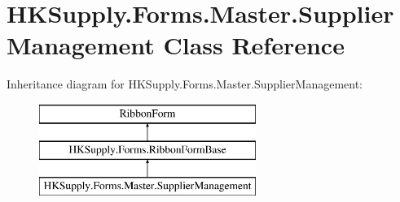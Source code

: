 \hypertarget{class_h_k_supply_1_1_forms_1_1_master_1_1_supplier_management}{}\section{H\+K\+Supply.\+Forms.\+Master.\+Supplier\+Management Class Reference}
\label{class_h_k_supply_1_1_forms_1_1_master_1_1_supplier_management}
Inheritance diagram for H\+K\+Supply.\+Forms.\+Master.\+Supplier\+Management\+:\begin{figure}[H]
\begin{center}
\leavevmode
\includegraphics[height=3.000000cm]{class_h_k_supply_1_1_forms_1_1_master_1_1_supplier_management}
\end{center}
\end{figure}
